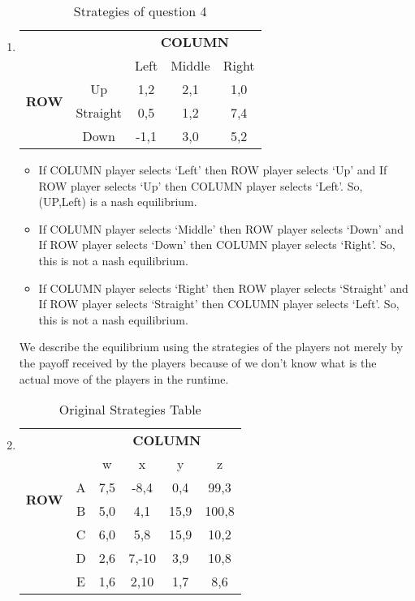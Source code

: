 \documentclass[a4paper,12pt]{article}
\begin{document}
\begin{enumerate}
\item%
\begin{table}[H]
\centering
\begin{tabular}{@{}ccccc@{}}
\toprule
\multicolumn{2}{c}{} & \multicolumn{3}{c}{\bfseries COLUMN}\\
\multicolumn{2}{c}{} & Left & Middle & Right\\
\multirow{2}{*}{\bfseries ROW} & Up & 1,2 & 2,1 & 1,0\\
 & Straight & 0,5 & 1,2 & 7,4\\
 & Down & -1,1 & 3,0 & 5,2\\
 \bottomrule
\end{tabular}
\caption{Strategies of question 4}
\end{table}
\begin{itemize}
\item
If COLUMN player selects `Left' then ROW player selects `Up' and If ROW player selects `Up' then COLUMN player selects `Left'. So, (UP,Left) is a nash equilibrium.
\item
If COLUMN player selects `Middle' then ROW player selects `Down' and If ROW player selects `Down' then COLUMN player selects `Right'. So, this is not a nash equilibrium.
\item
If COLUMN player selects `Right' then ROW player selects `Straight' and If ROW player selects `Straight' then COLUMN player selects `Left'. So, this is not a nash equilibrium.
\end{itemize}
We describe the equilibrium using the strategies of the players not merely by the payoff received by the players because of we don't know what is the actual move of the players in the runtime.
\item%
\begin{table}[H]
\centering
\begin{tabular}{@{}cccccc@{}}
\toprule
\multicolumn{2}{c}{} & \multicolumn{4}{c}{\bfseries COLUMN}\\
\multicolumn{2}{c}{} & w & x & y & z\\
\multirow{2}{*}{\bfseries ROW} & A & 7,5 & -8,4 & 0,4 & 99,3\\
 & B & 5,0 & 4,1 & 15,9 & 100,8\\
 & C & 6,0 & 5,8 & 15,9 & 10,2\\
 & D & 2,6 & 7,-10 & 3,9 & 10,8\\
 & E & 1,6 & 2,10 & 1,7 & 8,6\\
 \bottomrule
\end{tabular}
\caption{Original Strategies Table}
\end{table}


\end{enumerate}
\end{document}
